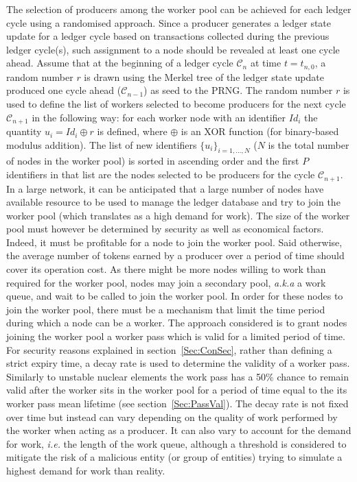 
The selection of producers among the worker pool can be achieved for each ledger cycle using a randomised approach. Since a producer generates a ledger state update for a ledger cycle based on transactions collected during the previous ledger cycle(s), such assignment to a node should be revealed at least one cycle ahead. Assume that at the beginning of a ledger cycle $\mathcal{C}_n$ at time $t = t_{n,0}$, a random number $r$ is drawn using the Merkel tree of the ledger state update produced one cycle ahead ($\mathcal{C}_{n-1}$) as seed to the PRNG. The random number $r$ is used to define the list of workers selected to become producers for the next cycle $\mathcal{C}_{n+1}$ in the following way: for each worker node with an identifier $Id_i$ the quantity $u_i = Id_i \oplus r$ is defined, where $\oplus$ is an XOR function (for binary-based modulus addition). The list of new identifiers $\{u_i \}_{i=1,...,N}$ ($N$ is the total number of nodes in the worker pool) is sorted in ascending order and the first $P$ identifiers in that list are the nodes selected to be producers for the cycle $\mathcal{C}_{n+1}$.\\


In a large network, it can be anticipated that a large number of nodes have available resource to be used to manage the ledger database and try to join the worker pool (which translates as a high demand for work).
The size of the worker pool must however be determined by security as well as economical factors. Indeed, it must be profitable for a node to join the worker pool. Said otherwise, the average number of tokens earned by a producer over a period of time should cover its operation cost. As there might be more nodes willing to work than required for the worker pool, nodes may join a secondary pool, \textit{a.k.a} a work queue, and wait to be called to join the worker pool. In order for these nodes to join the worker pool, there must be a mechanism that limit the time period during which a node can be a worker. The approach considered is to grant nodes joining the worker pool a worker pass which is valid for a limited period of time. For security reasons explained in section~\ref{Sec:ConSec}, rather than defining a strict expiry time, a decay rate is used to determine the validity of a worker pass. Similarly to unstable nuclear elements the work pass has a 50\% chance to remain valid after the worker sits in the worker pool for a period of time equal to the its worker pass mean lifetime (see section~\ref{Sec:PassVal}). The decay rate is not fixed over time but instead can vary depending on the quality of work performed by the worker when acting as a producer. It can also vary to account for the demand for work, \textit{i.e.} the length of the work queue, although a threshold is considered to mitigate the risk of a malicious entity (or group of entities) trying to simulate a highest demand for work than reality.\\ 


